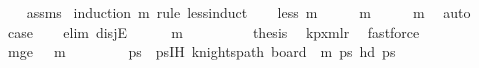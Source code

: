 \begin{isabellebody}
\ \ %
\endisadelimproof
%
\isatagproof
{}\isamarkupfalse%
\ assms\isanewline
{}\isamarkupfalse%
\ {\isacharparenleft}{\kern0pt}induction\ m\ rule{\isacharcolon}{\kern0pt}\ less{\isacharunderscore}{\kern0pt}induct{\isacharparenright}{\kern0pt}\isanewline
\ \ \isamarkupfalse%
\ {\isacharparenleft}{\kern0pt}less\ m{\isacharparenright}{\kern0pt}\isanewline
\ \ \isamarkupfalse%
\ \isamarkupfalse%
\ {\isachardoublequoteopen}m\ {\isasymin}\ {\isacharbraceleft}{\kern0pt}{}{\isacharcomma}{\kern0pt}{}{\isacharcomma}{\kern0pt}{}{\isacharcomma}{\kern0pt}{}{\isacharcomma}{\kern0pt}{}{\isacharbraceright}{\kern0pt}\ {\isasymor}\ {}\ {\isasymle}\ m{\isacharminus}{\kern0pt}{}{\isachardoublequoteclose}\ \isamarkupfalse%
\ auto\isanewline
\ \ \isamarkupfalse%
\ \isamarkupfalse%
\ {\isacharquery}{\kern0pt}case\isanewline
\ \ \isamarkupfalse%
\ {\isacharparenleft}{\kern0pt}elim\ disjE{\isacharparenright}{\kern0pt}\isanewline
\ \ \ \ \isamarkupfalse%
\ {\isachardoublequoteopen}m\ {\isasymin}\ {\isacharbraceleft}{\kern0pt}{}{\isacharcomma}{\kern0pt}{}{\isacharcomma}{\kern0pt}{}{\isacharcomma}{\kern0pt}{}{\isacharcomma}{\kern0pt}{}{\isacharbraceright}{\kern0pt}{\isachardoublequoteclose}\isanewline
\ \ \ \ \isamarkupfalse%
\ \isamarkupfalse%
\ {\isacharquery}{\kern0pt}thesis\ \isamarkupfalse%
\ kp{\isacharunderscore}{\kern0pt}{}xm{\isacharunderscore}{\kern0pt}lr\ \isamarkupfalse%
\ fastforce\isanewline
\ \ \isamarkupfalse%
\isanewline
\ \ \ \ \isamarkupfalse%
\ m{\isacharunderscore}{\kern0pt}ge{\isacharcolon}{\kern0pt}\ {\isachardoublequoteopen}{}\ {\isasymle}\ m{\isacharminus}{\kern0pt}{}{\isachardoublequoteclose}\ \isanewline
\ \ \ \ \isamarkupfalse%
\ \isamarkupfalse%
\ ps\ \ psIH{\isacharcolon}{\kern0pt}\ {\isachardoublequoteopen}knights{\isacharunderscore}{\kern0pt}path\ {\isacharparenleft}{\kern0pt}board\ {}\ {\isacharparenleft}{\kern0pt}m{\isacharminus}{\kern0pt}{}{\isacharparenright}{\kern0pt}{\isacharparenright}{\kern0pt}\ ps\ {\isachardoublequoteopen}hd\ ps\ {\isacharequal}{\kern0pt}\ {\isacharparenleft}{\kern0pt}{}{\isacharcomma}{\kern0pt}{}{\isacharparenright}{\kern0pt}{\isachardoublequoteclose}\ \isanewline

\end{isabellebody}
